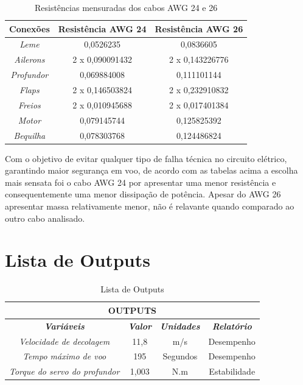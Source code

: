 \begin{table}[H]
\centering
\caption{Resistências mensuradas dos cabos AWG 24 e 26}
\label{tab:res_cabos}
\begin{tabular}{|c|c|c|}
\hline
\textbf{Conexões}  & \textbf{Resistência AWG 24} & \textbf{Resistência AWG 26} \\ \hline
\textit{Leme}      & 0,0526235                   & 0,0836605                   \\ \hline
\textit{Ailerons}  & 2 x 0,090091432             & 2 x 0,143226776             \\ \hline
\textit{Profundor} & 0,069884008                 & 0,111101144                 \\ \hline
\textit{Flaps}     & 2 x 0,146503824             & 2 x 0,232910832             \\ \hline
\textit{Freios}    & 2 x 0,010945688             & 2 x 0,017401384             \\ \hline
\textit{Motor}     & 0,079145744                 & 0,125825392                 \\ \hline
\textit{Bequilha}  & 0,078303768                 & 0,124486824                 \\ \hline
\end{tabular}
\end{table}

Com o objetivo de evitar qualquer tipo de falha técnica no circuito elétrico, garantindo
maior segurança em voo, de acordo com as tabelas acima a escolha mais sensata foi o cabo
AWG 24 por apresentar uma menor resistência e consequentemente uma menor dissipação de
potência. Apesar do AWG 26 apresentar massa relativamente menor, não é relavante quando
comparado ao outro cabo analisado.

\chapter{Lista de Outputs}\label{output.cap}

\begin{table}[H]
\centering
\caption{Lista de Outputs}
\label{tab:outputs}
\begin{tabular}{|c|c|c|c|}
\hline
\multicolumn{4}{|c|}{\textbf{OUTPUTS}}                                                                                     \\ \hline
\textit{\textbf{Variáveis}}           & \textit{\textbf{Valor}} & \textit{\textbf{Unidades}} & \textit{\textbf{Relatório}} \\ \hline
\textit{Velocidade de decolagem}      & 11,8                    & m/s                        & Desempenho                  \\ \hline
\textit{Tempo máximo de voo}          & 195                     & Segundos                   & Desempenho                  \\ \hline
\textit{Torque do servo do profundor} & 1,003                   & N.m                        & Estabilidade                \\ \hline
\end{tabular}
\end{table}